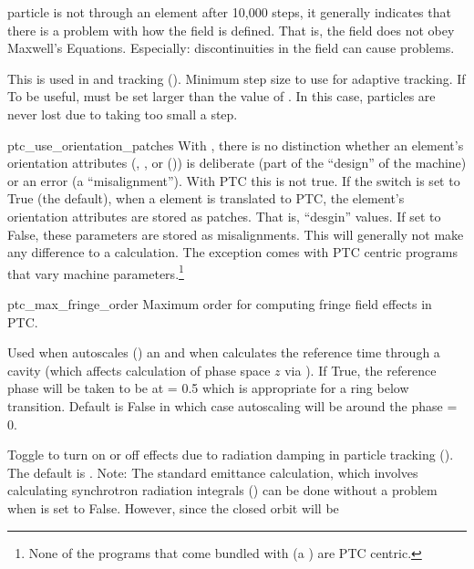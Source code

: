 {\begin{description}
particle is not through an element after 10,000 steps, it generally indicates that there is a
problem with how the field is defined. That is, the field does not obey Maxwell's
Equations. Especially: discontinuities in the field can cause problems.
%
\item[\vn{min_ds_adaptive_tracking}] \Newline
This is used in  and  tracking (). Minimum step
size to use for adaptive tracking. If To be useful,  must be set
larger than the value of . In this case, particles are never lost
due to taking too small a step.
%
\item{ptc_use_orientation_patches} \Newline
With \bmad, there is no distinction whether an element's orientation attributes (,
, or  ()) is deliberate (part of the ``design'' of the machine)
or an error (a ``misalignment'').  With PTC this is not true. If the 
switch is set to True (the default), when a \bmad element is translated to PTC,
the element's orientation attributes are stored as patches. That is, ``desgin'' values.
If set to False, these parameters are stored as misalignments. This will generally not make any
difference to a calculation. The exception comes with PTC centric programs that vary machine
parameters.\footnote
  {
None of the programs that come bundled with \bmad (a \bmad {}) are
PTC centric.
  }
%
\item{ptc_max_fringe_order} \Newline
Maximum order for computing fringe field effects in PTC. 
%
\item[\vn{rf_phase_below_transition_ref}] \Newline
Used when \bmad autoscales () an  and when \bmad calculates the
reference time through a cavity (which affects calculation of phase space $z$ via ).  If
True, the reference phase will be taken to be at  = 0.5 which is appropriate for a ring
below transition. Default is False in which case autoscaling will be around the phase  = 0.
%
\item[\vn{radiation_damping_on}] \Newline
Toggle to turn on or off effects due to radiation damping in particle tracking
(). The default is . Note: The standard \bmad emittance calculation,
which involves calculating synchrotron radiation integrals () can be done without
a problem when  is set to False. However, since the closed orbit will be

\end{description}}
